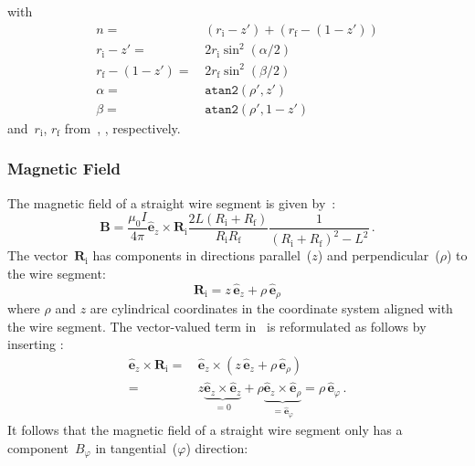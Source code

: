 with
\begin{align}
  n                       =&\, (r_\mathrm{i} - z') + (r_\mathrm{f} - (1 - z')) \\
  r_\mathrm{i} - z'       =&\, 2 r_\mathrm{i} \sin^2(\alpha/2) \label{eqn:ri_zp} \\
  r_\mathrm{f} - (1 - z') =&\, 2 r_\mathrm{f} \sin^2(\beta/2)  \label{eqn:rf_zp_1} \\
  \alpha =&\, \texttt{atan2}(\rho', z')   \label{eqn:sws_alpha} \\
  \beta  =&\, \texttt{atan2}(\rho', 1-z') \label{eqn:sws_beta}
\end{align}
and~$r_\mathrm{i}$, $r_\mathrm{f}$ from~, , respectively.

\subsubsection{Magnetic Field}
The magnetic field of a straight wire segment
is given by~\cite{hanson_hirshman_2002}:
\begin{equation}
 \mathbf{B}
 = \frac{\mu_0 I}{4 \pi}
   \hat{\mathbf{e}}_z \times \mathbf{R}_\mathrm{i}
   \frac{2 L (R_\mathrm{i} + R_\mathrm{f})}{R_\mathrm{i} R_\mathrm{f}} \frac{1}{\left(R_\mathrm{i} + R_\mathrm{f}\right)^2 - L^2} \, . \label{eqn:sws_B_phi}
\end{equation}
The vector~$\mathbf{R}_\mathrm{i}$ has components in directions parallel~($z$) and perpendicular~($\rho$) to the wire segment:
\begin{equation}
 \mathbf{R}_\mathrm{i}
 = z \,\hat{\mathbf{e}}_z + \rho \,\hat{\mathbf{e}}_\rho \label{eqn:R_i_vec}
\end{equation}
where $\rho$ and $z$ are cylindrical coordinates in the coordinate system aligned with the wire segment.
The vector-valued term in~ is reformulated as follows by inserting :
\begin{align}
 \hat{\mathbf{e}}_z \times \mathbf{R}_\mathrm{i}
 =&\, \hat{\mathbf{e}}_z \times \left( z \,\hat{\mathbf{e}}_z + \rho \,\hat{\mathbf{e}}_\rho \right) \nonumber \\
 =&\,      z \underbrace{\hat{\mathbf{e}}_z \times \hat{\mathbf{e}}_z}_{=0}
      + \rho \underbrace{\hat{\mathbf{e}}_z \times \hat{\mathbf{e}}_\rho}_{=\hat{\mathbf{e}}_\varphi}
 = \rho \,\hat{\mathbf{e}}_\varphi \, .
\end{align}
It follows that the magnetic field of a straight wire segment only has a component~$B_\varphi$ in tangential~($\varphi$) direction:
